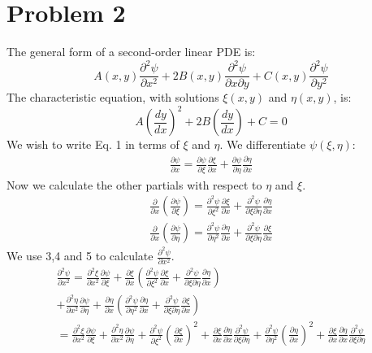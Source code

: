 \documentclass[a4paper,10pt]{article}
\numberwithin{equation}{section}
\begin{document}
\section{Problem 2}
The general form of a second-order linear PDE is:
\begin{equation}
 A(x,y)\frac{\partial ^2 \psi}{\partial x^2}+2B(x,y)\frac{\partial ^2\psi}{\partial x \partial y}+C(x,y)\frac{\partial ^2 \psi}{\partial y^2}
\end{equation}
The characteristic equation,  with solutions $\xi(x,y)$ and $\eta(x,y)$, is:
\begin{equation}
 A(\frac{dy}{dx})^2+2B(\frac{dy}{dx})+C=0
\end{equation}
We wish to write Eq. 1 in terms of $\xi$ and $\eta$. We differentiate $\psi(\xi, \eta)$:
\begin{gather}
\frac{\partial \psi}{\partial x}=\frac{\partial \psi}{\partial \xi}\frac{\partial \xi}{\partial x}+\frac{\partial \psi}{\partial \eta}\frac{\partial \eta}{\partial x}
\end{gather}
Now we calculate the other partials with respect to $\eta$ and $\xi$.
\begin{gather}
\frac{\partial}{\partial x}(\frac{\partial \psi}{\partial \xi})=\frac{\partial ^2 \psi}{\partial \xi^2}\frac{\partial \xi}{\partial x}+
\frac{\partial ^2 \psi}{\partial \xi \partial \eta}\frac{\partial \eta}{\partial x}\\
\frac{\partial}{\partial x}(\frac{\partial \psi}{\partial \eta})=\frac{\partial ^2 \psi}{\partial \eta^2}\frac{\partial \eta}{\partial x}+
\frac{\partial ^2 \psi}{\partial \xi \partial \eta}\frac{\partial \xi}{\partial x}
\end{gather}
We use 3,4 and 5 to calculate $\frac{\partial ^2 \psi}{\partial x^2}$.
\begin{gather*}
\frac{\partial ^2 \psi}{\partial x^2} = \frac{\partial ^2 \xi}{\partial x^2}\frac{\partial \psi}{\partial \xi}
+\frac{\partial \xi}{\partial x}(\frac{\partial ^2 \psi}{\partial \xi^2}\frac{\partial \xi}{\partial x}+
\frac{\partial ^2 \psi}{\partial \xi \partial \eta}\frac{\partial \eta}{\partial x})\\
+\frac{\partial ^2 \eta}{\partial x^2}\frac{\partial \psi}{\partial \eta}
+\frac{\partial \eta}{\partial x}(\frac{\partial ^2 \psi}{\partial \eta^2}\frac{\partial \eta}{\partial x}+
\frac{\partial ^2 \psi}{\partial \xi \partial \eta}\frac{\partial \xi}{\partial x})\\
=\frac{\partial ^2 \xi}{\partial x^2}\frac{\partial \psi}{\partial \xi}+\frac{\partial ^2 \eta}{\partial x^2}\frac{\partial \psi}{\partial \eta}
+\frac{\partial ^2 \psi}{\partial \xi ^2}(\frac{\partial \xi}{\partial x})^2 +\frac{\partial \xi}{\partial x}\frac{\partial \eta}{\partial x}
\frac{\partial ^2 \psi}{\partial \xi \partial \eta}+\frac{\partial ^2 \psi}{\partial \eta ^2}(\frac{\partial \eta}{\partial x})^2
+\frac{\partial \xi}{\partial x}\frac{\partial \eta}{\partial x}\frac{\partial ^2 \psi}{\partial \xi \partial \eta}
\end{gather*}
\end{document}
